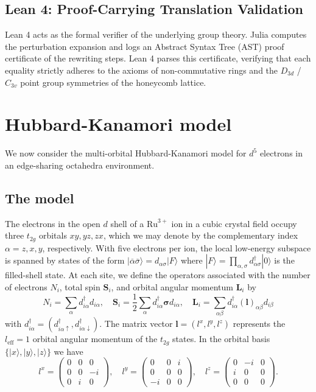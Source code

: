 \documentclass[11pt, a4paper]{article}
\begin{document}
\subsection{Lean 4: Proof-Carrying Translation Validation}
Lean 4 acts as the formal verifier of the underlying group theory. Julia computes the perturbation expansion and logs an Abstract Syntax Tree (AST) proof certificate of the rewriting steps. Lean 4 parses this certificate, verifying that each equality strictly adheres to the axioms of non-commutative rings and the $D_{3d}$ / $C_{3v}$ point group symmetries of the honeycomb lattice.

\newpage
\section{Hubbard-Kanamori model}

We now consider the multi-orbital Hubbard-Kanamori model for $d^5$ electrons in an edge-sharing octahedra environment.

\subsection{The model}
The electrons in the open $d$ shell of a $\text{Ru}^{3+}$ ion in a cubic crystal field occupy three $t_{2g}$ orbitals $xy, yz, zx$, which we may denote by the complementary index $\alpha = z, x, y$, respectively. With five electrons per ion, the local low-energy subspace is spanned by states of the form $|\overline{\alpha}\overline{\sigma}\rangle = d_{\alpha\sigma}|F\rangle$ where $|F\rangle = \prod_{\alpha,\sigma}d_{\alpha\sigma}^{\dagger}|0\rangle$ is the filled-shell state. At each site, we define the operators associated with the number of electrons $N_i$, total spin $\bm{S}_i$, and orbital angular momentum $\bm{L}_i$ by
\begin{equation}
N_i = \sum_{\alpha}d_{i\alpha}^{\dagger}d_{i\alpha}, \quad \bm{S}_i = \frac{1}{2}\sum_{\alpha}d_{i\alpha}^{\dagger}\bm{\sigma} d_{i\alpha}, \quad \bm{L}_i = \sum_{\alpha\beta}d_{i\alpha}^{\dagger}(\bm{l})_{\alpha\beta}d_{i\beta}
\end{equation}
with $d_{i\alpha}^{\dagger} = (d_{i\alpha\uparrow}^{\dagger}, d_{i\alpha\downarrow}^{\dagger})$. The matrix vector $\bm{l} = (l^x, l^y, l^z)$ represents the $l_{\text{eff}}=1$ orbital angular momentum of the $t_{2g}$ states. In the orbital basis $\{|x\rangle, |y\rangle, |z\rangle\}$ we have
\begin{equation}
l^x = \begin{pmatrix} 0 & 0 & 0 \\ 0 & 0 & -i \\ 0 & i & 0 \end{pmatrix}, \quad 
l^y = \begin{pmatrix} 0 & 0 & i \\ 0 & 0 & 0 \\ -i & 0 & 0 \end{pmatrix}, \quad 
l^z = \begin{pmatrix} 0 & -i & 0 \\ i & 0 & 0 \\ 0 & 0 & 0 \end{pmatrix}.
\end{equation}
\end{document}

